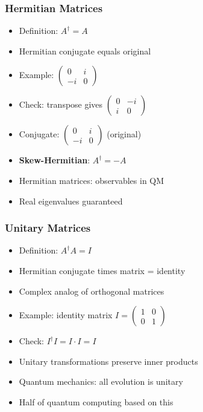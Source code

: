 \begin{frame}[fragile]\frametitle{Hermitian Matrices}
  \begin{itemize}
    \item Definition: $A^\dagger = A$
    \item Hermitian conjugate equals original
    \item Example: $\begin{pmatrix} 0 & i \\ -i & 0 \end{pmatrix}$
    \item Check: transpose gives $\begin{pmatrix} 0 & -i \\ i & 0 \end{pmatrix}$
    \item Conjugate: $\begin{pmatrix} 0 & i \\ -i & 0 \end{pmatrix}$ (original)
    \item \textbf{Skew-Hermitian}: $A^\dagger = -A$
    \item Hermitian matrices: observables in QM
    \item Real eigenvalues guaranteed
  \end{itemize}
\end{frame}

\begin{frame}[fragile]\frametitle{Unitary Matrices}
  \begin{itemize}
    \item Definition: $A^\dagger A = I$
    \item Hermitian conjugate times matrix = identity
    \item Complex analog of orthogonal matrices
    \item Example: identity matrix $I = \begin{pmatrix} 1 & 0 \\ 0 & 1 \end{pmatrix}$
    \item Check: $I^\dagger I = I \cdot I = I$
    \item Unitary transformations preserve inner products
    \item Quantum mechanics: all evolution is unitary
    \item Half of quantum computing based on this
  \end{itemize}
\end{frame}

